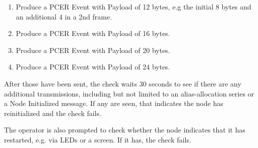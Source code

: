 \begin{enumerate}
\item Produce a PCER Event with Payload of 12 bytes, 
    e.g the initial 8 bytes and an additional 4 in a 2nd frame.
\item Produce a PCER Event with Payload of 16 bytes.
\item Produce a PCER Event with Payload of 20 bytes.
\item Produce a PCER Event with Payload of 24 bytes.
\end{enumerate}

After those have been sent, the check waits 30 seconds to see if there are any additional
transmissions, including but not limited to an alias-allocation series or a Node
Initialized message. If any are seen, that indicates the node has reinitialized
and the check fails.

The operator is also prompted to check whether the node indicates that it has
restarted, e.g. via LEDs or a screen.  If it has, the check fails.

  
